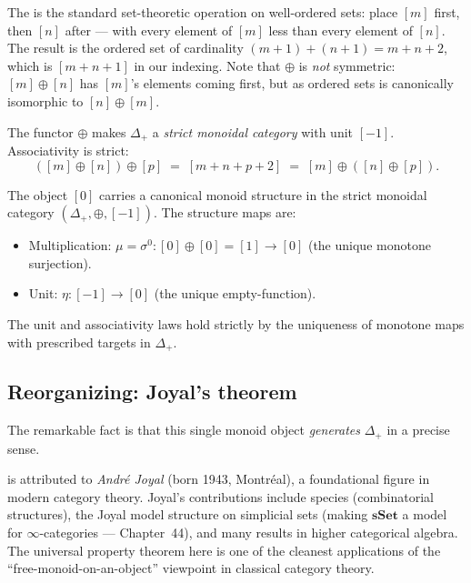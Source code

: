 \begin{nameorigin}
The  is the standard set-theoretic operation on
well-ordered sets: place $[m]$ first, then $[n]$ after — with every
element of $[m]$ less than every element of $[n]$. The result is the
ordered set of cardinality $(m+1) + (n+1) = m + n + 2$, which is
$[m + n + 1]$ in our indexing. Note that $\oplus$ is \emph{not}
symmetric: $[m] \oplus [n]$ has $[m]$'s elements coming first, but as
ordered sets is canonically isomorphic to $[n] \oplus [m]$.
\end{nameorigin}

\begin{theorem}
\label{thm:delta-plus-monoidal}
The functor $\oplus$ makes $\Delta_+$ a \emph{strict monoidal category}
with unit $[-1]$. Associativity is strict:
\begin{equation*}
  ([m] \oplus [n]) \oplus [p] \;=\; [m + n + p + 2] \;=\; [m] \oplus ([n] \oplus [p]).
\end{equation*}
\end{theorem}

\begin{remark}
The object $[0]$ carries a canonical monoid structure in the strict
monoidal category $(\Delta_+, \oplus, [-1])$. The structure maps are:
\begin{itemize}
  \item Multiplication: $\mu = \sigma^0 : [0] \oplus [0] = [1] \to [0]$
        (the unique monotone surjection).
  \item Unit: $\eta : [-1] \to [0]$ (the unique empty-function).
\end{itemize}
The unit and associativity laws hold strictly by the uniqueness of
monotone maps with prescribed targets in $\Delta_+$.
\end{remark}

\subsection{Reorganizing: Joyal's theorem}

The remarkable fact is that this single monoid object \emph{generates}
$\Delta_+$ in a precise sense.

\begin{nameorigin}
 is attributed to
\emph{André Joyal} (born 1943, Montréal), a foundational figure in
modern category theory. Joyal's contributions include species
(combinatorial structures), the Joyal model structure on simplicial sets
(making $\mathbf{sSet}$ a model for $\infty$-categories — Chapter~44),
and many results in higher categorical algebra. The universal property
theorem here is one of the cleanest applications of the
``free-monoid-on-an-object'' viewpoint in classical category theory.
\end{nameorigin}

